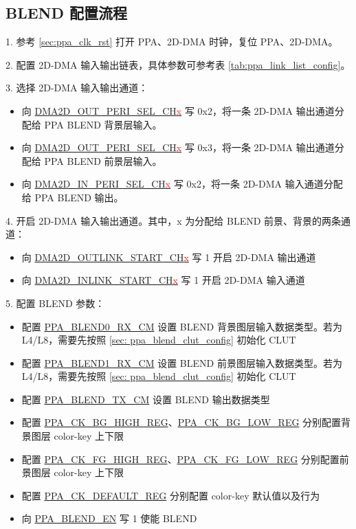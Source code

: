 \documentclass[main\_\_CN.tex]{subfiles}
\begin{document}
\subsection{BLEND 配置流程}
1. 参考 \ref{sec:ppa_clk_rst} 打开 PPA、2D-DMA 时钟，复位 PPA、2D-DMA。

2. 配置 2D-DMA 输入输出链表，具体参数可参考表 \ref{tab:ppa_link_list_config}。

3. 选择 2D-DMA 输入输出通道：
\begin{itemize}
    \item 向 \hyperref[fielddesc:DMA2DOUTPERISELCHN]{DMA2D\_OUT\_PERI\_SEL\_CH\textcolor{red}{x}} 写 0x2，将一条 2D-DMA 输出通道分配给 PPA BLEND 背景层输入。
    \item 向 \hyperref[fielddesc:DMA2DOUTPERISELCHN]{DMA2D\_OUT\_PERI\_SEL\_CH\textcolor{red}{x}} 写 0x3，将一条 2D-DMA 输出通道分配给 PPA BLEND 前景层输入。
    \item 向 \hyperref[fielddesc:DMA2DINPERISELCHN]{DMA2D\_IN\_PERI\_SEL\_CH\textcolor{red}{x}} 写 0x2，将一条 2D-DMA 输入通道分配给 PPA BLEND 输出。
\end{itemize}

4. 开启 2D-DMA 输入输出通道。其中，x 为分配给 BLEND 前景、背景的两条通道：
\begin{itemize}
    \item 向 \hyperref[fielddesc:DMA2DOUTLINKSTARTCHN]{DMA2D\_OUTLINK\_START\_CH\textcolor{red}{x}} 写 1 开启 2D-DMA 输出通道
    \item 向 \hyperref[fielddesc:DMA2DINLINKSTARTCHN]{DMA2D\_INLINK\_START\_CH\textcolor{red}{x}} 写 1 开启 2D-DMA 输入通道
\end{itemize}

5. 配置 BLEND 参数：

\begin{itemize}
    \item 配置 \hyperref[fielddesc:PPABLEND0RXCM]{PPA\_BLEND0\_RX\_CM} 设置 BLEND 背景图层输入数据类型。若为 L4/L8，需要先按照 \ref{sec: ppa_blend_clut_config} 初始化 CLUT
    \item 配置 \hyperref[fielddesc:PPABLEND1RXCM]{PPA\_BLEND1\_RX\_CM} 设置 BLEND 前景图层输入数据类型。若为 L4/L8，需要先按照 \ref{sec: ppa_blend_clut_config} 初始化 CLUT
    \item 配置 \hyperref[fielddesc:PPABLENDTXCM]{PPA\_BLEND\_TX\_CM} 设置 BLEND 输出数据类型
    \item 配置 \hyperref[regdesc:PPACKBGHIGHREG]{PPA\_CK\_BG\_HIGH\_REG}、\hyperref[regdesc:PPACKBGLOWREG]{PPA\_CK\_BG\_LOW\_REG} 分别配置背景图层 color-key 上下限
    \item 配置 \hyperref[regdesc:PPACKFGHIGHREG]{PPA\_CK\_FG\_HIGH\_REG}、\hyperref[regdesc:PPACKFGLOWREG]{PPA\_CK\_FG\_LOW\_REG} 分别配置前景图层 color-key 上下限
    \item 配置 \hyperref[regdesc:PPACKDEFAULTREG]{PPA\_CK\_DEFAULT\_REG} 分别配置 color-key 默认值以及行为
    \item 向 \hyperref[fielddesc:PPABLENDEN]{PPA\_BLEND\_EN} 写 1 使能 BLEND
\end{itemize}
\end{document}
